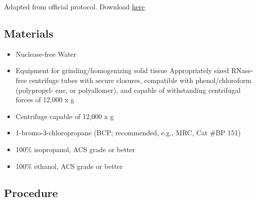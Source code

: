 \documentclass[
  letterpaper,
  DIV=11,
  numbers=noendperiod]{scrreprt}
\begin{document}
Adapted from official protocol. Download
\href{http://depts.washington.edu/kellylab/wp-content/uploads/2013/06/Tri-Reagent-Protocol.pdf}{here}

\hypertarget{materials}{%
\subsection*{\texorpdfstring{\textbf{Materials}}{Materials}}\label{materials}}

\begin{itemize}
\item
  Nuclease-free Water
\item
  Equipment for grinding/homogenizing solid tissue Appropriately sized
  RNase-free centrifuge tubes with secure closures, compatible with
  phenol/chloroform (polypropyl- ene, or polyallomer), and capable of
  withstanding centrifugal forces of 12,000 x g
\item
  Centrifuge capable of 12,000 x g
\item
  1-bromo-3-chloropropane (BCP; recommended, e.g., MRC, Cat \#BP 151)
\item
  100\% isopropanol, ACS grade or better
\item
  100\% ethanol, ACS grade or better
\end{itemize}

\hypertarget{procedure}{%
\subsection*{\texorpdfstring{\textbf{Procedure}}{Procedure}}\label{procedure}}
\end{document}

